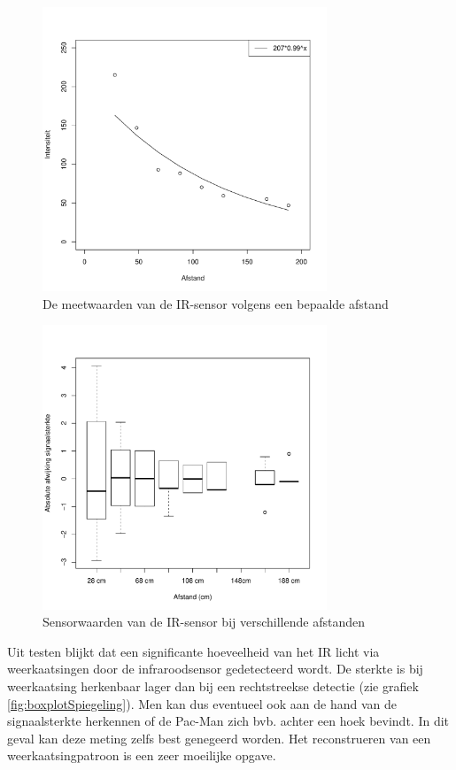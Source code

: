 \documentclass[12pt,a4paper]{report}
\begin{document}
\begin{figure}[htbp]
  \centering
  \includegraphics[width=85mm]{resources/plotIR.pdf}
  \caption{De meetwaarden van de IR-sensor volgens een bepaalde afstand}
  \label{fig:plotIR}
\end{figure}

\begin{figure}
\begin{center}
 \includegraphics[width=85mm]{./resources/bloxplotIR.pdf}
 \caption{Sensorwaarden van de IR-sensor bij verschillende afstanden}
 \label{fig:boxplotIR}
\end{center}
\end{figure}

Uit testen blijkt dat een significante hoeveelheid van het IR licht via weerkaatsingen door de infraroodsensor gedetecteerd wordt.
De sterkte is bij weerkaatsing herkenbaar lager dan bij een rechtstreekse detectie (zie grafiek \ref{fig:boxplotSpiegeling}).  Men kan dus eventueel ook aan de hand van de signaalsterkte herkennen of de Pac-Man zich bvb. achter een hoek bevindt. In dit geval kan deze meting zelfs best genegeerd worden. Het reconstrueren van een weerkaatsingpatroon is een zeer moeilijke opgave.
\end{document}
